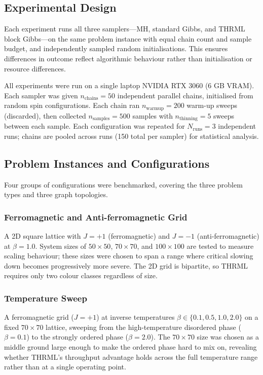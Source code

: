 \documentclass[conference]{IEEEtran}
\begin{document}
\subsection{Experimental Design}

Each experiment runs all three samplers---MH, standard Gibbs, and THRML block Gibbs---on the same problem instance with equal chain count and sample budget, and independently sampled random initialisations. This ensures differences in outcome reflect algorithmic behaviour rather than initialisation or resource differences.

All experiments were run on a single laptop NVIDIA RTX 3060 (6 GB VRAM). Each sampler was given $n_{\mathrm{chains}} = 50$ independent parallel chains, initialised from random spin configurations. Each chain ran $n_{\mathrm{warmup}} = 200$ warm-up sweeps (discarded), then collected $n_{\mathrm{samples}} = 500$ samples with $n_{\mathrm{thinning}} = 5$ sweeps between each sample. Each configuration was repeated for $N_{\mathrm{runs}} = 3$ independent runs; chains are pooled across runs (150 total per sampler) for statistical analysis.

\subsection{Problem Instances and Configurations}

Four groups of configurations were benchmarked, covering the three problem types and three graph topologies.

\subsubsection{Ferromagnetic and Anti-ferromagnetic Grid}

A 2D square lattice with $J = +1$ (ferromagnetic) and $J = -1$ (anti-ferromagnetic) at $\beta = 1.0$. System sizes of $50{\times}50$, $70{\times}70$, and $100{\times}100$ are tested to measure scaling behaviour; these sizes were chosen to span a range where critical slowing down becomes progressively more severe. The 2D grid is bipartite, so THRML requires only two colour classes regardless of size.

\subsubsection{Temperature Sweep}

A ferromagnetic grid ($J = +1$) at inverse temperatures $\beta \in \{0.1, 0.5, 1.0, 2.0\}$ on a fixed $70{\times}70$ lattice, sweeping from the high-temperature disordered phase ($\beta = 0.1$) to the strongly ordered phase ($\beta = 2.0$). The $70{\times}70$ size was chosen as a middle ground large enough to make the ordered phase hard to mix on, revealing whether THRML's throughput advantage holds across the full temperature range rather than at a single operating point.
\end{document}
